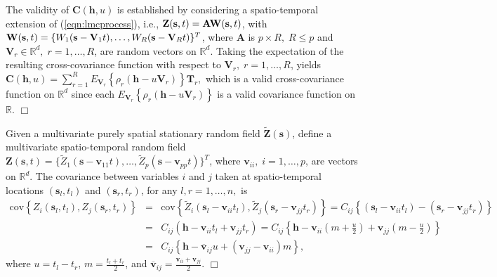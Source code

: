 \documentclass[12pt]{article}
\newcommand{\0}{\mathbf{0}}
\begin{document}

The validity of $\mathbf{C}(\mathbf{h}, u)$ is established by considering a spatio-temporal extension of (\ref{eqn:lmcprocess}), i.e.,
$\mathbf{Z}(\mathbf{s},t)=\mathbf{A} {\bf W}(\mathbf{s},t)$, with ${\bf W}(\mathbf{s},t)=\{W_{1}(\mathbf{s}-\mathbf{V}_1t),\ldots,W_{R}(\mathbf{s}-\mathbf{V}_R t)\}^T$,
where $\mathbf{A}$ is $p\times R,\;R\leq p$ and $\mathbf{V}_{r}\in \mathbb{R}^d,\;r=1,\ldots,R$, are random vectors on $\mathbb{R}^d$. Taking the expectation of the resulting cross-covariance function with respect to $\mathbf{V}_{r},\;r=1,\ldots,R$, yields
$
\mathbf{C}(\mathbf{h}, u)=\sum_{r=1}^{R} E_{\mathbf{V}_r}\left\{\rho_r(\mathbf{h}-u\mathbf{V}_r)\right\} \mathbf{T}_r,
$
which is a valid cross-covariance function on $\mathbb{R}^d$ since each $E_{\mathbf{V}_r}\left\{\rho_r(\mathbf{h}-u\mathbf{V}_r)\right\}$ is a valid covariance function on $\mathbb{R}$. \hfill $\Box$
\vspace{.2cm}


Given a multivariate purely spatial stationary random field $\tilde{\mathbf{Z}}(\mathbf{s})$, define a multivariate spatio-temporal random field 
$\mathbf{Z}(\mathbf{s},t)=\{\tilde{Z}_1\left(\mathbf{s}-\mathbf{v}_{11}t\right),\ldots,\tilde{Z}_p\left(\mathbf{s}-\mathbf{v}_{pp}t\right)\}^T$,
where $\mathbf{v}_{ii},\;i=1,\ldots,p$, are vectors on $\mathbb{R}^d$. The covariance between variables $i$ and $j$ taken at spatio-temporal locations $(\mathbf{s}_l,t_l)$ and $(\mathbf{s}_r,t_r)$, for any $l,r=1,\ldots,n,$ is
\begin{eqnarray*}
\mbox{cov}\left\{Z_{i}(\mathbf{s}_l,t_l),Z_{j}(\mathbf{s}_r,t_r)\right\} &=& \text{cov}\left\{\tilde{Z}_{i}(\mathbf{s}_l-\mathbf{v}_{ii}t_l),\tilde{Z}_{j}(\mathbf{s}_r-\mathbf{v}_{jj}t_r)\right\}
=C_{ij}\left\{\left(\mathbf{s}_l-\mathbf{v}_{ii}t_l\right)-\left(\mathbf{s}_r-\mathbf{v}_{jj}t_r\right)\right\}\\
&=& C_{ij}\left(\mathbf{h}-\mathbf{v}_{ii}t_l+\mathbf{v}_{jj}t_r\right)
=C_{ij}\left\{\mathbf{h}-\mathbf{v}_{ii}\left(m+\frac{u}{2}\right)+\mathbf{v}_{jj}\left(m-\frac{u}{2}\right)\right\}\\
&=& C_{ij}\left\{\mathbf{h}-\overline{\mathbf{v}}_{ij}u+\left(\mathbf{v}_{jj}-\mathbf{v}_{ii}\right)m\right\},
\end{eqnarray*}
where $u=t_l-t_r$, $m=\frac{t_l+t_r}{2}$, and $\overline{\mathbf{v}}_{ij}=\frac{\mathbf{v}_{ii}+\mathbf{v}_{jj}}{2}$. \hfill $\Box$



\baselineskip=20pt
%


\end{document}
